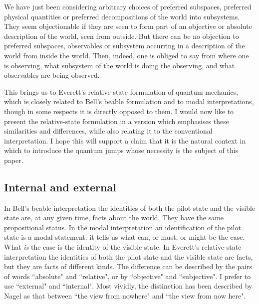 \documentclass[12pt,a4paper,reqno]{article}
\renewcommand{\(}{\left(}
\renewcommand{\)}{\right)}
\newcommand{\<}{\langle}
\renewcommand{\>}{\rangle}
\theoremstyle{plain} %
\theoremstyle{definition}
\theoremstyle{remark}
\begin{document}
We have just been considering arbitrary choices of preferred
subspaces, preferred physical quantities or preferred decompositions of the world
into subsystems. They seem objectionable if they are seen to form part
of an objective or absolute description of the world, seen from outside.
But there can be no objection to preferred subspaces, observables or
subsystem occurring in a description of the world from inside the world.
Then, indeed, one is obliged to say from where one is observing, what
subsystem of the world is doing the observing, and what observables are
being observed.

This brings us to Everett's relative-state formulation of quantum
mechanics, which is closely related to Bell's beable formulation and to
modal interpretations, though in some respects it is directly opposed to
them. I would now like to present the relative-state formulation in a 
version which emphasises these similarities and differences, while also
relating it to the conventional interpretation. I hope this will support
a claim that it is the natural context in which to introduce the quantum
jumps whose necessity is the subject of this paper.


\subsection{Internal and external}

In Bell's beable interpretation the identities of both the pilot state 
and the visible state are, at any given time, facts about the world.
They have the same propositional status. In the modal interpretation an
identification of the pilot state is a modal statement: it tells us what
can, or must, or might be the case. What \emph{is} the case is the 
identity of the visible state. In Everett's relative-state
interpretation the identities of both the pilot state and the visible
state are facts, but they are facts of different kinds. The difference
can be described by the pairs of words ``absolute" and ``relative", or
by ``objective" and ``subjective". I prefer to use ``external" and
``internal". Most vividly, the distinction has been described by Nagel
\cite{Nagel:nowhere} as that between ``the view from nowhere" and ``the
view from now here".
\end{document}
